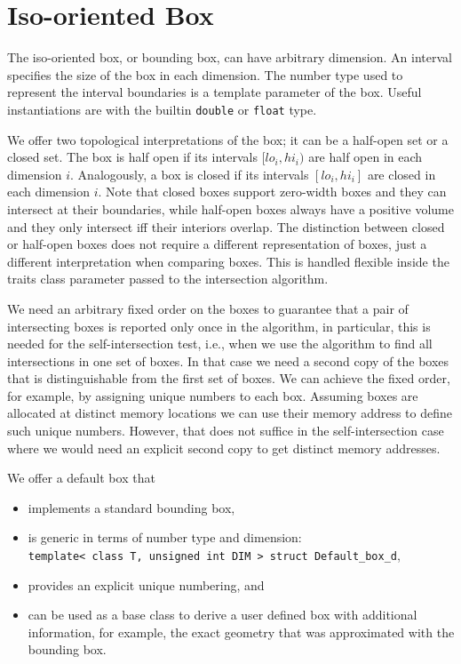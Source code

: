 \section{Iso-oriented Box}

The iso-oriented box, or bounding box, can have arbitrary dimension.
An interval specifies the size of the box in each dimension. The
number type used to represent the interval boundaries is a template
parameter of the box. Useful instantiations are with the builtin
\texttt{double} or \texttt{float} type.

We offer two topological interpretations of the box; it can be a
half-open set or a closed set. The box is half open if its intervals
$[lo_i,hi_i)$ are half open in each dimension $i$. Analogously, a box
is closed if its intervals $[lo_i,hi_i]$ are closed in each dimension
$i$. Note that closed boxes support zero-width boxes and they can
intersect at their boundaries, while half-open boxes always have a
positive volume and they only intersect iff their interiors overlap.
The distinction between closed or half-open boxes does not require a
different representation of boxes, just a different interpretation
when comparing boxes. This is handled flexible inside the traits class
parameter passed to the intersection algorithm.

We need an arbitrary fixed order on the boxes to guarantee that a pair
of intersecting boxes is reported only once in the algorithm, in
particular, this is needed for the self-intersection test, i.e., when
we use the algorithm to find all intersections in one set of boxes. In
that case we need a second copy of the boxes that is distinguishable
from the first set of boxes. We can achieve the fixed order, for
example, by assigning unique numbers to each box. Assuming boxes are
allocated at distinct memory locations we can use their memory address
to define such unique numbers. However, that does not suffice in the
self-intersection case where we would need an explicit second copy to
get distinct memory addresses.

We offer a default box that
\begin{itemize}
  \item implements a standard bounding box,
  \item is generic in terms of number type and dimension: \\
  \texttt{template< class T, unsigned int DIM > struct Default\_box\_d},
  \item provides an explicit unique numbering, and
  \item can be used as a base class to derive a user defined box with
  additional information, for example, the exact geometry
  that was approximated with the bounding box.
\end{itemize}

